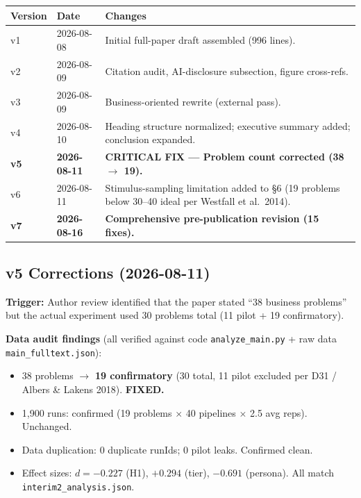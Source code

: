 \documentclass[12pt,a4paper]{article}
\begin{document}
\begin{table}[h]
\centering
\small
\begin{tabular}{llp{9cm}}
\toprule
Version & Date & Changes \\
\midrule
v1 & 2026-08-08 & Initial full-paper draft assembled (996 lines). \\
v2 & 2026-08-09 & Citation audit, AI-disclosure subsection, figure cross-refs. \\
v3 & 2026-08-09 & Business-oriented rewrite (external pass). \\
v4 & 2026-08-10 & Heading structure normalized; executive summary added; conclusion expanded. \\
\textbf{v5} & \textbf{2026-08-11} & \textbf{CRITICAL FIX --- Problem count corrected (38 $\to$ 19).} \\
v6 & 2026-08-11 & Stimulus-sampling limitation added to \S 6 (19 problems below 30--40 ideal per Westfall et al.\ 2014). \\
\textbf{v7} & \textbf{2026-08-16} & \textbf{Comprehensive pre-publication revision (15 fixes).} \\
\bottomrule
\end{tabular}
\end{table}

\subsection*{v5 Corrections (2026-08-11)}

\textbf{Trigger:} Author review identified that the paper stated ``38 business problems''
but the actual experiment used 30 problems total (11 pilot + 19 confirmatory).

\textbf{Data audit findings} (all verified against code \texttt{analyze\_main.py} + raw data
\texttt{main\_fulltext.json}):
\begin{itemize}
  \item 38 problems $\to$ \textbf{19 confirmatory} (30 total, 11 pilot excluded per D31 / Albers \& Lakens 2018). \textbf{FIXED.}
  \item 1,900 runs: confirmed (19 problems $\times$ 40 pipelines $\times$ 2.5 avg reps). Unchanged.
  \item Data duplication: 0 duplicate runIds; 0 pilot leaks. Confirmed clean.
  \item Effect sizes: $d = -0.227$ (H1), $+0.294$ (tier), $-0.691$ (persona). All match \texttt{interim2\_analysis.json}.
\end{itemize}
\end{document}

